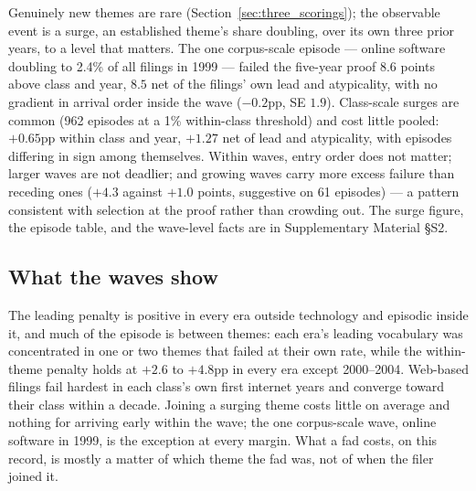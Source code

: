 Genuinely new themes are rare (Section~\ref{sec:three_scorings}); the
observable event is a surge, an established theme's share doubling, over
its own three prior years, to a level that matters. The one corpus-scale
episode --- online software doubling to 2.4\% of all filings in 1999 ---
failed the five-year proof $8.6$ points above class and year, $8.5$ net
of the filings' own lead and atypicality, with no gradient in arrival
order inside the wave ($-0.2$pp, SE $1.9$). Class-scale surges are common
(962 episodes at a 1\% within-class threshold) and cost little pooled:
$+0.65$pp within class and year, $+1.27$ net of lead and atypicality,
with episodes differing in sign among themselves. Within waves, entry
order does not matter; larger waves are not deadlier; and growing waves
carry more excess failure than receding ones ($+4.3$ against $+1.0$
points, suggestive on 61 episodes) --- a pattern consistent with
selection at the proof rather than crowding out. The surge figure, the
episode table, and the wave-level facts are in Supplementary Material
\S S2.

\subsection{What the waves show}\label{sec:waves_conclusion}

The leading penalty is positive in every era outside technology and
episodic inside it, and much of the episode is between themes: each
era's leading vocabulary was concentrated in one or two themes that
failed at their own rate, while the within-theme penalty holds at $+2.6$
to $+4.8$pp in every era except 2000--2004. Web-based filings fail hardest in each class's own first
internet years and converge toward their class within a decade. Joining a
surging theme costs little on average and nothing for arriving early
within the wave; the one corpus-scale wave, online software in 1999, is
the exception at every margin. What a fad costs, on this record, is
mostly a matter of which theme the fad was, not of when the filer joined
it.
